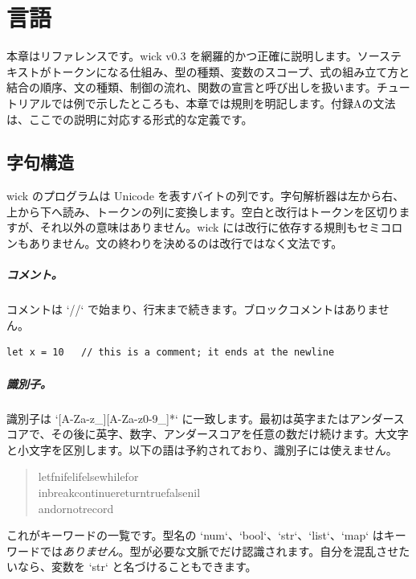 \chapter{言語}

本章はリファレンスです。wick v0.3 を網羅的かつ正確に説明します。ソーステキストがトークンになる仕組み、型の種類、変数のスコープ、式の組み立て方と結合の順序、文の種類、制御の流れ、関数の宣言と呼び出しを扱います。チュートリアルでは例で示したところも、本章では規則を明記します。付録Aの文法は、ここでの説明に対応する形式的な定義です。

\section{字句構造}

wick のプログラムは Unicode を表すバイトの列です。字句解析器は左から右、上から下へ読み、トークンの列に変換します。空白と改行はトークンを区切りますが、それ以外の意味はありません。wick には改行に依存する規則もセミコロンもありません。文の終わりを決めるのは改行ではなく文法です。

\paragraph{コメント。} コメントは `//` で始まり、行末まで続きます。ブロックコメントはありません。

\begin{lstlisting}[language=wick]
let x = 10   // this is a comment; it ends at the newline
\end{lstlisting}

\paragraph{識別子。} 識別子は `[A-Za-z_][A-Za-z0-9_]*` に一致します。最初は英字またはアンダースコアで、その後に英字、数字、アンダースコアを任意の数だけ続けます。大文字と小文字を区別します。以下の語は予約されており、識別子には使えません。

\begin{quote}
\ttfamily let\quad fn\quad if\quad elif\quad else\quad while\quad for\\
in\quad break\quad continue\quad return\quad true\quad false\quad nil\\
and\quad or\quad not\quad record
\end{quote}

\noindent
これがキーワードの一覧です。型名の `num`、`bool`、`str`、`list`、`map` はキーワードでは\emph{ありません}。型が必要な文脈でだけ認識されます。自分を混乱させたいなら、変数を `str` と名づけることもできます。

